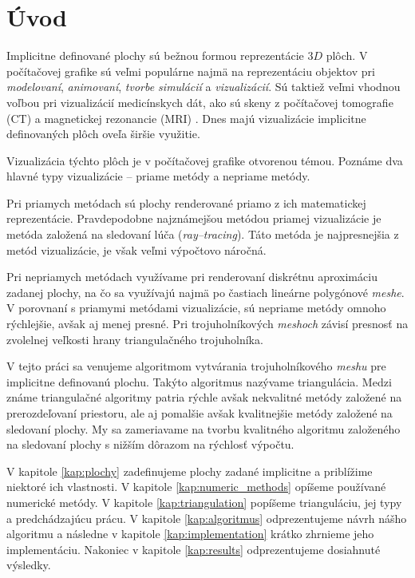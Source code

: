 \chapter*{Úvod} %

Implicitne definované plochy sú bežnou formou reprezentácie $3D$ plôch. V počítačovej grafike 
sú veľmi populárne najmä na reprezentáciu objektov pri \textit{modelovaní}, \textit{animovaní}, 
\textit{tvorbe simulácií} a \textit{vizualizácií}. Sú taktiež veľmi vhodnou
voľbou pri vizualizácií medicínskych dát, ako sú skeny z počítačovej tomografie (CT) a magnetickej
rezonancie (MRI) \cite{de2015survey}.
Dnes majú vizualizácie implicitne definovaných plôch oveľa širšie využitie.

Vizualizácia týchto plôch je v počítačovej grafike otvorenou témou. Poznáme 
dva hlavné typy vizualizácie -- priame metódy a nepriame metódy. 

Pri priamych metódach sú plochy renderované priamo z ich 
matematickej reprezentácie. Pravdepodobne najznámejšou metódou priamej vizualizácie je 
metóda založená na sledovaní lúča (\textit{ray--tracing}). Táto metóda je najpresnejšia z metód vizualizácie,
je však veľmi výpočtovo náročná.

Pri nepriamych metódach využívame pri renderovaní diskrétnu aproximáciu zadanej plochy, 
na čo sa využívajú najmä po častiach lineárne polygónové \textit{meshe}. 
V porovnaní s priamymi metódami 
vizualizácie, sú nepriame metódy omnoho rýchlejšie, avšak aj menej presné. Pri trojuholníkových 
\textit{meshoch} závisí presnosť na zvolelnej veľkosti hrany triangulačného trojuholníka. 

V tejto práci sa venujeme algoritmom vytvárania trojuholníkového \textit{meshu} pre 
implicitne definovanú plochu. Takýto algoritmus nazývame triangulácia. Medzi známe triangulačné 
algoritmy patria rýchle avšak nekvalitné metódy založené na prerozdeľovaní priestoru, 
ale aj pomalšie avšak kvalitnejšie metódy založené na sledovaní plochy.
My sa zameriavame na tvorbu kvalitného algoritmu založeného na sledovaní plochy
s nižším dôrazom na rýchlosť výpočtu.

V kapitole \ref{kap:plochy} zadefinujeme plochy zadané implicitne a priblížime niektoré ich vlastnosti.
V kapitole \ref{kap:numeric_methods} opíšeme používané numerické metódy.
V kapitole \ref{kap:triangulation} popíšeme trianguláciu, jej typy a predchádzajúcu prácu.
V kapitole \ref{kap:algoritmus} odprezentujeme návrh nášho algoritmu a následne v kapitole 
\ref{kap:implementation} krátko zhrnieme jeho implementáciu.
Nakoniec v kapitole \ref{kap:results} odprezentujeme dosiahnuté výsledky. 



